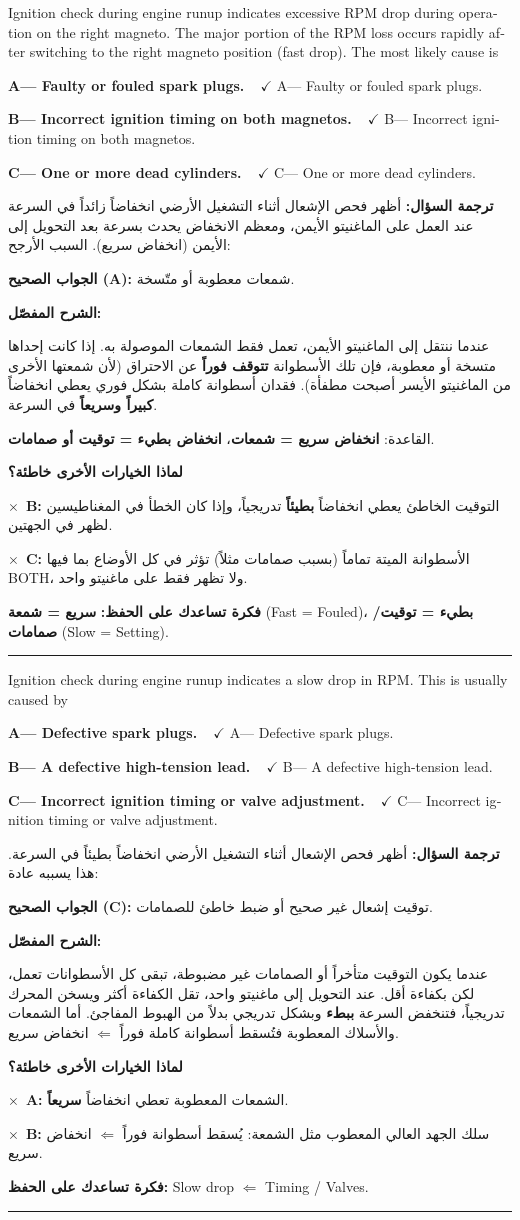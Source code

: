 \documentclass[11pt,a4paper]{article}
\newcommand{\en}[1]{\textenglish{#1}}
\newcommand{\correctletter}{}
\newcommand{\opt}[2]{%
  \ifdefstring{\correctletter}{#1}%
    {\textcolor{ansgreen}{\textbf{#1— #2\ \ $\checkmark$}}}%
    {#1— #2}\par}
\newcommand{\Q}[6]{%
  \renewcommand{\correctletter}{#6}%
  \par\bigskip
  \phantomsection\label{q#1}%
  \begin{tcolorbox}[enhanced,breakable,colback=qback,colframe=qframe,
      arc=2mm,boxrule=0.8pt,fonttitle=\bfseries,
      title={\en{Question #1}}]
    \begin{english}
      #2\par\smallskip
      \opt{A}{#3}\opt{B}{#4}\opt{C}{#5}
    \end{english}
  \end{tcolorbox}}
\newcommand{\tr}[1]{\textbf{\textcolor{qframe}{ترجمة السؤال:}} #1\par}
\newcommand{\ans}[2]{%
  \begin{tcolorbox}[colback=ansback,colframe=ansgreen,boxrule=0.6pt,arc=1.5mm,
      left=4pt,right=4pt,top=2pt,bottom=2pt]
    \textbf{\textcolor{ansgreen}{الجواب الصحيح (\en{#1}):}} #2
  \end{tcolorbox}}
\newcommand{\sharh}[1]{\textbf{\textcolor{conceptc}{الشرح المفصّل:}}\par #1\par}
\newcommand{\nohead}{\textbf{\textcolor{wrongc}{لماذا الخيارات الأخرى خاطئة؟}}\par}
\newcommand{\no}[2]{\hspace*{1em}\textcolor{wrongc}{$\times$}\ \textbf{\en{#1}:} #2\par}
\newcommand{\tip}[1]{%
  \begin{tcolorbox}[colback=tipback,colframe=tipframe,boxrule=0.5pt,arc=1.5mm,
      left=4pt,right=4pt,top=2pt,bottom=2pt]
    \textbf{فكرة تساعدك على الحفظ:} #1
  \end{tcolorbox}}
\newcommand{\qsep}{\par\medskip\noindent\textcolor{qframe!40}{\rule{\linewidth}{0.4pt}}\par}
\begin{document}
\Q{8590}{Ignition check during engine runup indicates excessive RPM drop during operation on the right magneto. The major portion of the RPM loss occurs rapidly after switching to the right magneto position (fast drop). The most likely cause is}
{Faulty or fouled spark plugs.}
{Incorrect ignition timing on both magnetos.}
{One or more dead cylinders.}{A}
\tr{أظهر فحص الإشعال أثناء التشغيل الأرضي انخفاضاً زائداً في السرعة عند العمل على الماغنيتو الأيمن، ومعظم الانخفاض يحدث بسرعة بعد التحويل إلى الأيمن (انخفاض سريع). السبب الأرجح:}
\ans{A}{شمعات معطوبة أو متّسخة.}
\sharh{عندما ننتقل إلى الماغنيتو الأيمن، تعمل فقط الشمعات الموصولة به. إذا كانت إحداها متسخة أو معطوبة، فإن تلك الأسطوانة \textbf{تتوقف فوراً} عن الاحتراق (لأن شمعتها الأخرى من الماغنيتو الأيسر أصبحت مطفأة). فقدان أسطوانة كاملة بشكل فوري يعطي انخفاضاً \textbf{كبيراً وسريعاً} في السرعة.

القاعدة: \textbf{انخفاض سريع = شمعات}، \textbf{انخفاض بطيء = توقيت أو صمامات}.}
\nohead
\no{B}{التوقيت الخاطئ يعطي انخفاضاً \textbf{بطيئاً} تدريجياً، وإذا كان الخطأ في المغناطيسين لظهر في الجهتين.}
\no{C}{الأسطوانة الميتة تماماً (بسبب صمامات مثلاً) تؤثر في كل الأوضاع بما فيها \en{BOTH}، ولا تظهر فقط على ماغنيتو واحد.}
\tip{\textbf{سريع = شمعة} (\en{Fast = Fouled})، \textbf{بطيء = توقيت/صمامات} (\en{Slow = Setting}).}
\qsep

\Q{8598}{Ignition check during engine runup indicates a slow drop in RPM. This is usually caused by}
{Defective spark plugs.}
{A defective high-tension lead.}
{Incorrect ignition timing or valve adjustment.}{C}
\tr{أظهر فحص الإشعال أثناء التشغيل الأرضي انخفاضاً بطيئاً في السرعة. هذا يسببه عادة:}
\ans{C}{توقيت إشعال غير صحيح أو ضبط خاطئ للصمامات.}
\sharh{عندما يكون التوقيت متأخراً أو الصمامات غير مضبوطة، تبقى كل الأسطوانات تعمل، لكن بكفاءة أقل. عند التحويل إلى ماغنيتو واحد، تقل الكفاءة أكثر ويسخن المحرك تدريجياً، فتنخفض السرعة \textbf{ببطء} وبشكل تدريجي بدلاً من الهبوط المفاجئ. أما الشمعات والأسلاك المعطوبة فتُسقط أسطوانة كاملة فوراً $\Leftarrow$ انخفاض سريع.}
\nohead
\no{A}{الشمعات المعطوبة تعطي انخفاضاً \textbf{سريعاً}.}
\no{B}{سلك الجهد العالي المعطوب مثل الشمعة: يُسقط أسطوانة فوراً $\Leftarrow$ انخفاض سريع.}
\tip{\en{Slow drop} $\Leftarrow$ \en{Timing / Valves}.}
\qsep
\end{document}
